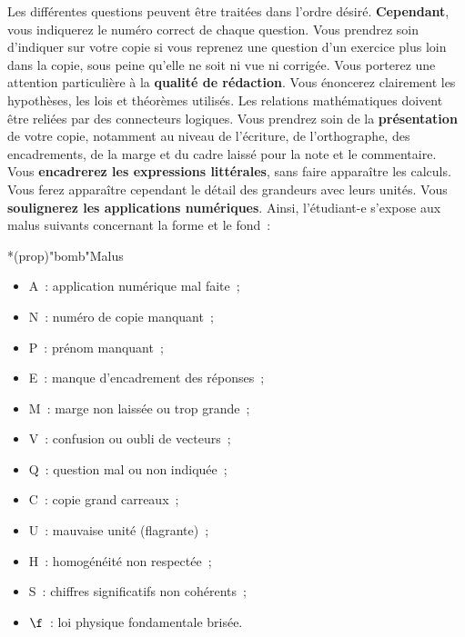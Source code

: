\documentclass[a4paper, 10pt, garamond]{book}
\begin{document}
{Les différentes questions peuvent être traitées dans l'ordre désiré.
\textbf{Cependant}, vous indiquerez le numéro correct de chaque question. Vous
prendrez soin d'indiquer sur votre copie si vous reprenez une question d'un
exercice plus loin dans la copie, sous peine qu'elle ne soit ni vue ni
corrigée.
\bigbreak
Vous porterez une attention particulière à la \textbf{qualité de rédaction}.
Vous énoncerez clairement les hypothèses, les lois et théorèmes utilisés. Les
relations mathématiques doivent être reliées par des connecteurs logiques.
\bigbreak
Vous prendrez soin de la \textbf{présentation} de votre copie, notamment au
niveau de l'écriture, de l'orthographe, des encadrements, de la marge et du
cadre laissé pour la note et le commentaire. Vous \textbf{encadrerez les
	expressions littérales}, sans faire apparaître les calculs. Vous ferez
apparaître cependant le détail des grandeurs avec leurs unités. Vous
\textbf{soulignerez les applications numériques}.
\bigbreak
Ainsi, l'étudiant-e s'expose aux malus suivants concernant la forme et le
fond~:
\begin{tcb}*(prop)"bomb"{Malus}
	\begin{minipage}[t]{0.50\linewidth}
		\begin{itemize}
			\item A~: application numérique mal faite~;
			\item N~: numéro de copie manquant~;
			\item P~: prénom manquant~;
			\item E~: manque d'encadrement des réponses~;
			\item M~: marge non laissée ou trop grande~;
			\item V~: confusion ou oubli de vecteurs~;
		\end{itemize}
	\end{minipage}
	\begin{minipage}[t]{0.50\linewidth}
		\begin{itemize}
			\item Q~: question mal ou non indiquée~;
			\item C~: copie grand carreaux~;
			\item U~: mauvaise unité (flagrante)~;
			\item H~: homogénéité non respectée~;
			\item S~: chiffres significatifs non cohérents~;
			\item $\f$~: loi physique fondamentale brisée.
		\end{itemize}
	\end{minipage}
\end{tcb}

}
\end{document}
